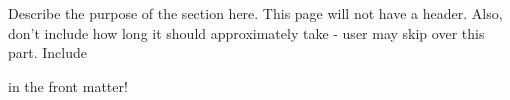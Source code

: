\newenvironment{abstract}
	{\cleardoublepage\thispagestyle{empty}\null\vfill\begin{center}%
    \bfseries\abstractname\end{center}}%
    {\vfill\null}
		\begin{abstract}

		Describe the purpose of the section here. This page will not have a header. Also, don't include how long it should approximately take - user may skip over this part. Include
		
		in the front matter!

		\end{abstract}